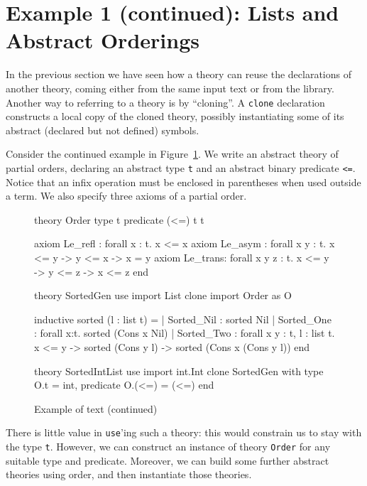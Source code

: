 \section{Example 1 (continued): Lists and Abstract Orderings}

In the previous section we have seen how a theory can reuse the
declarations of another theory, coming either from the same input
text or from the library. Another way to referring to a theory is
by ``cloning''. A \texttt{clone} declaration constructs a local
copy of the cloned theory, possibly instantiating some of its
abstract (\ie declared but not defined) symbols.

Consider the continued example in Figure~\ref{fig:tutorial2}.
We write an abstract theory of partial orders, declaring an
abstract type \texttt{t} and an abstract binary predicate
\texttt{<=}. Notice that an infix operation must be enclosed
in parentheses when used outside a term. We also specify
three axioms of a partial order.

\begin{figure}
\centering
\begin{whycode}
theory Order
  type t
  predicate (<=) t t

  axiom Le_refl : forall x : t. x <= x
  axiom Le_asym : forall x y : t. x <= y -> y <= x -> x = y
  axiom Le_trans: forall x y z : t. x <= y -> y <= z -> x <= z
end

theory SortedGen
  use import List
  clone import Order as O

  inductive sorted (l : list t) =
    | Sorted_Nil :
        sorted Nil
    | Sorted_One :
        forall x:t. sorted (Cons x Nil)
    | Sorted_Two :
        forall x y : t, l : list t.
        x <= y -> sorted (Cons y l) -> sorted (Cons x (Cons y l))
end

theory SortedIntList
  use import int.Int
  clone SortedGen with type O.t = int, predicate O.(<=) = (<=)
end
\end{whycode}
\vspace*{-1em}%
\caption{Example of \why text (continued)}
\label{fig:tutorial2}
\end{figure}

There is little value in \texttt{use}'ing such a theory: this
would constrain us to stay with the type \texttt{t}. However,
we can construct an instance of theory \texttt{Order} for
any suitable type and predicate. Moreover, we can build some
further abstract theories using order, and then instantiate
those theories.

